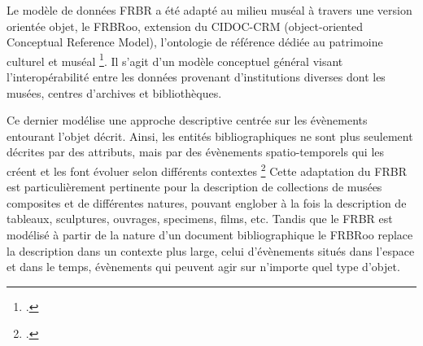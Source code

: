 

Le modèle de données \gls{FRBR} a été adapté au milieu muséal à travers une version orientée objet, le \gls{FRBRoo}, extension du \gls{CIDOC-CRM} (object-oriented Conceptual Reference Model), l'ontologie de référence dédiée au patrimoine culturel et muséal \footcite{gillis2015}. Il s’agit d’un modèle conceptuel général visant l’interopérabilité entre les données provenant d’institutions diverses dont les musées, centres d’archives et bibliothèques.  

Ce dernier modélise une approche descriptive centrée sur les évènements entourant l’objet décrit. Ainsi, les entités bibliographiques ne sont plus seulement décrites par des attributs, mais par des évènements spatio-temporels qui les créent et les font évoluer selon différents contextes \footcite{dialogue2017} Cette adaptation du \gls{FRBR} est particulièrement pertinente pour la description de collections de musées composites et de différentes natures, pouvant englober à la fois la description de tableaux, sculptures, ouvrages, specimens, films, etc. Tandis que le \gls{FRBR} est modélisé à partir de la nature d’un document bibliographique le FRBRoo replace la description dans un contexte plus large, celui d’évènements situés dans l’espace et dans le temps, évènements qui peuvent agir sur n’importe quel type d’objet.  

